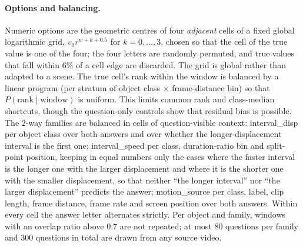 \paragraph{Options and balancing.}
Numeric options are the geometric centres of four \emph{adjacent} cells of a fixed global logarithmic grid, $v_0 r^{w+k+0.5}$ for $k=0,\dots,3$, chosen so that the cell of the true value is one of the four; the four letters are randomly permuted, and true values that fall within 6\% of a cell edge are discarded.
The grid is global rather than adapted to a scene. The true cell's rank within the window is balanced by a linear program (per stratum of object class $\times$ frame-distance bin) so that $P(\text{rank}\mid\text{window})$ is uniform. This limits common rank and class-median shortcuts, though the question-only controls show that residual bias is possible.
The 2-way families are balanced in cells of question-visible context: interval\_disp per object class over both answers and over whether the longer-displacement interval is the first one; interval\_speed per class, duration-ratio bin and split-point position, keeping in equal numbers only the cases where the faster interval is the longer one with the larger displacement and where it is the shorter one with the smaller displacement, so that neither ``the longer interval'' nor ``the larger displacement'' predicts the answer; motion\_source per class, label, clip length, frame distance, frame rate and screen position over both answers.
Within every cell the answer letter alternates strictly.
Per object and family, windows with an overlap ratio above 0.7 are not repeated; at most 80 questions per family and 300 questions in total are drawn from any source video.

